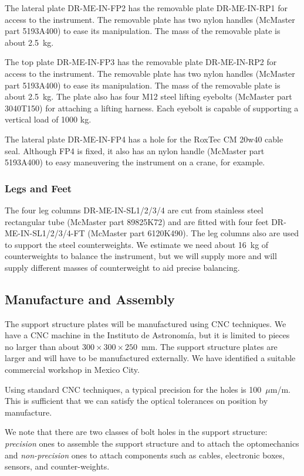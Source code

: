 \documentclass{article}
\newcommand{\micron}{\mbox{$\mu$m}}
\begin{document}
The lateral plate DR-ME-IN-FP2 has the removable plate DR-ME-IN-RP1 for  access to the instrument. The removable plate has two nylon handles (McMaster part 5193A400) to ease its manipulation. The mass of the removable plate is about 2.5~kg.

The top plate DR-ME-IN-FP3 has the removable plate DR-ME-IN-RP2 for access to the instrument. The removable plate has two nylon handles (McMaster part 5193A400) to ease its manipulation. The mass of the removable plate is about 2.5~kg. The plate also has four M12 steel lifting eyebolts (McMaster part 3040T150) for attaching a lifting harness. Each eyebolt is capable of supporting a vertical load of 1000 kg.

The lateral plate DR-ME-IN-FP4 has a hole for the RoxTec CM 20w40 cable seal. Although FP4 is fixed, it also has an nylon handle (McMaster part 5193A400) to easy maneuvering the instrument on a crane, for example.

\subsubsection{Legs and Feet}

The four leg columns DR-ME-IN-SL1/2/3/4 are cut from stainless steel rectangular tube (McMaster part 89825K72) and are fitted with four feet DR-ME-IN-SL1/2/3/4-FT (McMaster part 6120K490). The leg columns also are used to support the steel counterweights. We estimate we need about 16~kg of counterweights to balance the instrument, but we will supply more and will supply different masses of counterweight to aid precise balancing.

\subsection{Manufacture and Assembly}

The support structure plates will be manufactured using CNC techniques. 
We have a CNC machine in the Instituto de Astronomía, but it is limited to pieces no larger than about $300 \times 300 \times 250$~mm. The support structure plates are larger and will have to be manufactured externally. We have identified a suitable commercial workshop in Mexico City.

Using standard CNC techniques, a typical precision for the holes is 100~{\micron}/m. This is sufficient that we can satisfy the optical tolerances on position by manufacture. 

We note that there are two classes of bolt holes in the support structure: \emph{precision} ones to assemble the support structure and to attach the optomechanics and \emph{non-precision} ones to attach components such as cables, electronic boxes, sensors, and counter-weights. 
\end{document}

